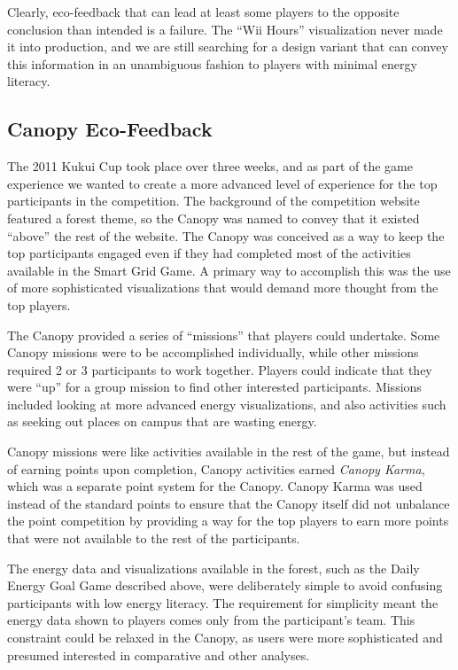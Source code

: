 \documentclass{sigchi}
\begin{document}
Clearly, eco-feedback that can lead at least some players to the opposite conclusion than intended is a failure. The ``Wii Hours'' visualization never made it into production, and we are still searching for a design variant that can convey this information in an unambiguous fashion to players with minimal energy literacy.


\subsection{Canopy Eco-Feedback}

The 2011 Kukui Cup took place over three weeks, and as part of the game experience we wanted to create a more advanced level of experience for the top participants in the competition. The background of the competition website featured a forest theme, so the Canopy was named to convey that it existed ``above'' the rest of the website. The Canopy was conceived as a way to keep the top participants engaged even if they had completed most of the activities available in the Smart Grid Game. A primary way to accomplish this was the use of more sophisticated visualizations that would demand more thought from the top players. 

The Canopy provided a series of ``missions'' that players could undertake. Some Canopy missions were to be accomplished individually, while other missions required 2 or 3 participants to work together. Players could indicate that they were ``up'' for a group mission to find other interested participants. Missions included looking at more advanced energy visualizations, and also activities such as seeking out places on campus that are wasting energy.

Canopy missions were like activities available in the rest of the game, but instead of earning points upon completion, Canopy activities earned \emph{Canopy Karma}, which was a separate point system for the Canopy. Canopy Karma was used instead of the standard points to ensure that the Canopy itself did not unbalance the point competition by providing a way for the top players to earn more points that were not available to the rest of the participants.

The energy data and visualizations available in the forest, such as the Daily Energy Goal Game described above, were deliberately simple to avoid confusing participants with low energy literacy. The requirement for simplicity meant the energy data shown to players comes only from the participant's team. This constraint could be relaxed in the Canopy, as users were more sophisticated and presumed interested in comparative and other analyses.
\end{document}
